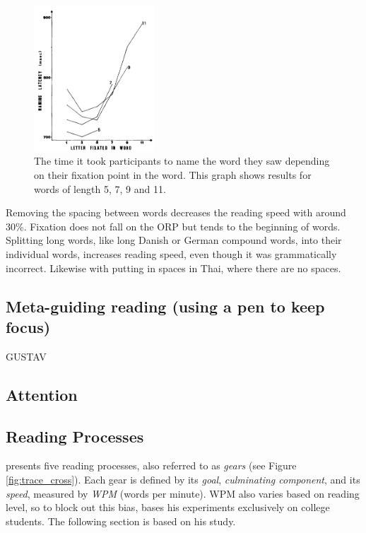 \begin{figure}[htbp]
\centering
\includegraphics[width=0.4\textwidth]{Pics/ucurve}
\caption{The time it took participants to name the word they saw depending on their fixation point in the word. This graph shows results for words of length 5, 7, 9 and 11. \protect\cite{oregan_convenient_1984}}
\label{fig:ucurve}
\end{figure}

Removing the spacing between words decreases the reading speed with around 30\%. Fixation does not fall on the ORP but tends to the beginning of words. Splitting long words, like long Danish or German compound words, into their individual words, increases reading speed, even though it was grammatically incorrect. Likewise with putting in spaces in Thai, where there are no spaces.

\subsection{Meta-guiding reading (using a pen to keep focus)}
GUSTAV

\subsection{Attention}


\subsection{Reading Processes}
 presents five reading processes, also referred to as \textit{gears} (see Figure \ref{fig:trace_cross}). Each gear is defined by its \textit{goal}, \textit{culminating component}, and its \textit{speed}, measured by \textit{WPM} (words per minute). WPM also varies based on reading level, so to block out this bias, \citeauthor{carver_reading_1992} bases his experiments exclusively on college students. The following section is based on his study.

